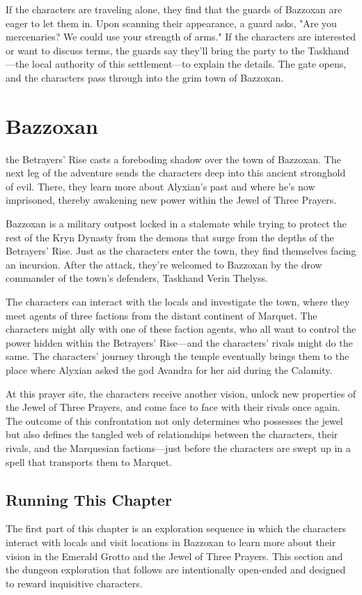 \documentclass[10pt,a4paper,twoside,bg=print,twocolumn,openany,nodeprecatedcode]{dndbook}
\begin{document}
If the characters are traveling alone, they find that the guards of Bazzoxan are eager to let them in. Upon scanning their appearance, a guard asks, "Are you mercenaries? We could use your strength of arms." If the characters are interested or want to discuss terms, the guards say they'll bring the party to the Taskhand—the local authority of this settlement—to explain the details. The gate opens, and the characters pass through into the grim town of Bazzoxan.

\chapter{Bazzoxan}
 the Betrayers' Rise casts a foreboding shadow over the town of Bazzoxan. The next leg of the adventure sends the characters deep into this ancient stronghold of evil. There, they learn more about Alyxian's past and where he's now imprisoned, thereby awakening new power within the Jewel of Three Prayers.


Bazzoxan is a military outpost locked in a stalemate while trying to protect the rest of the Kryn Dynasty from the demons that surge from the depths of the Betrayers' Rise. Just as the characters enter the town, they find themselves facing an incursion. After the attack, they're welcomed to Bazzoxan by the drow commander of the town's defenders, Taskhand Verin Thelyss.

The characters can interact with the locals and investigate the town, where they meet agents of three factions from the distant continent of Marquet. The characters might ally with one of these faction agents, who all want to control the power hidden within the Betrayers' Rise—and the characters' rivals might do the same. The characters' journey through the temple eventually brings them to the place where Alyxian asked the god Avandra for her aid during the Calamity.

At this prayer site, the characters receive another vision, unlock new properties of the Jewel of Three Prayers, and come face to face with their rivals once again. The outcome of this confrontation not only determines who possesses the jewel but also defines the tangled web of relationships between the characters, their rivals, and the Marquesian factions—just before the characters are swept up in a spell that transports them to Marquet.

\section{Running This Chapter}
The first part of this chapter is an exploration sequence in which the characters interact with locals and visit locations in Bazzoxan to learn more about their vision in the Emerald Grotto and the Jewel of Three Prayers. This section and the dungeon exploration that follows are intentionally open-ended and designed to reward inquisitive characters.
\end{document}
